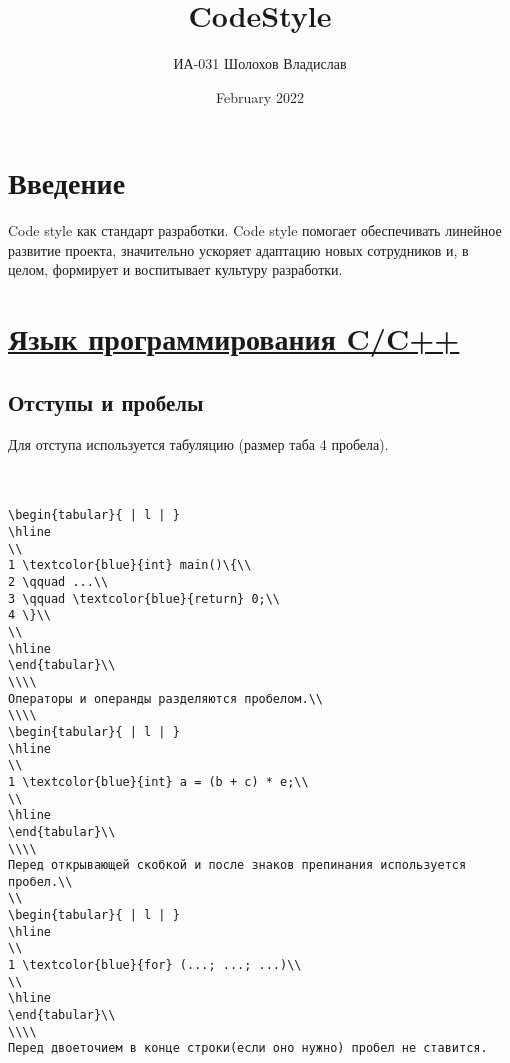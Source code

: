 \documentclass{article}
\title{\textbf{CodeStyle}}
\author{ИА-031 Шолохов Владислав}
\affil{github: @SBZ03; email: sholokhov.02@list.ru}
\date{February 2022}
\begin{document}
\maketitle

\section{Введение}
Code style как стандарт разработки. Code style помогает обеспечивать линейное развитие проекта, значительно ускоряет адаптацию новых сотрудников и, в целом, формирует и воспитывает культуру разработки.\cite{1}

\section{\underline{Язык программирования C/C++}}

\subsection{Отступы и пробелы}
Для отступа используется табуляцию (размер таба 4 пробела).\\
\\\\
\begin{lstlisting}
\begin{tabular}{ | l | }
\hline
\\
1 \textcolor{blue}{int} main()\{\\
2 \qquad ...\\
3 \qquad \textcolor{blue}{return} 0;\\
4 \}\\
\\
\hline
\end{tabular}\\
\\\\
Операторы и операнды разделяются пробелом.\\
\\\\
\begin{tabular}{ | l | }
\hline
\\
1 \textcolor{blue}{int} a = (b + c) * e;\\
\\
\hline
\end{tabular}\\
\\\\
Перед открывающей скобкой и после знаков препинания используется пробел.\\
\\
\begin{tabular}{ | l | }
\hline
\\
1 \textcolor{blue}{for} (...; ...; ...)\\
\\
\hline
\end{tabular}\\
\\\\
Перед двоеточием в конце строки(если оно нужно) пробел не ставится.
\end{lstlisting}
\end{document}

